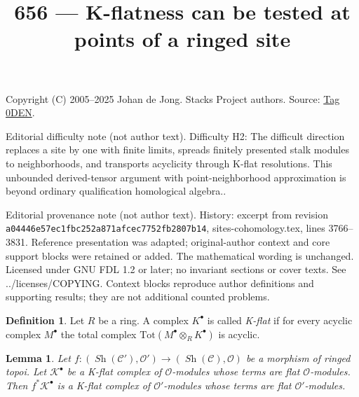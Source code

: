 \documentclass{amsart}
\theoremstyle{plain}
\newtheorem{lemma}[subsection]{Lemma}
\theoremstyle{definition}
\newtheorem{definition}[subsection]{Definition}
\theoremstyle{remark}
\numberwithin{equation}{subsection}
\def\Sh{\mathop{\mathit{Sh}}\nolimits}
\begin{document}
\title[Stacks Project, Tag 0DEN]{656 --- K-flatness can be tested at points of a ringed site}
\maketitle
\noindent Copyright (C) 2005--2025 Johan de Jong. Stacks Project authors. Source: \href{https://stacks.math.columbia.edu/tag/0DEN}{Tag 0DEN}.

\noindent Editorial difficulty note (not author text). Difficulty H2: The difficult direction replaces a site by one with finite limits, spreads finitely presented stalk modules to neighborhoods, and transports acyclicity through K-flat resolutions. This unbounded derived-tensor argument with point-neighborhood approximation is beyond ordinary qualification homological algebra..

\noindent Editorial provenance note (not author text). History: excerpt from revision \texttt{a0444\allowbreak 6e57e\allowbreak c1fbc\allowbreak 252a8\allowbreak 71afc\allowbreak ec775\allowbreak 2fb28\allowbreak 07b14}, sites-cohomology.tex, lines 3766--3831. Reference presentation was adapted; original-author context and core support blocks were retained or added. The mathematical wording is unchanged. Licensed under GNU FDL 1.2 or later; no invariant sections or cover texts. See ../licenses/COPYING. Context blocks reproduce author definitions and supporting results; they are not additional counted problems.

\begin{definition}
\label{more-algebra-definition-K-flat}
Let $R$ be a ring. A complex $K^\bullet$ is called {\it K-flat}
if for every acyclic complex $M^\bullet$ the total complex
$\text{Tot}(M^\bullet \otimes_R K^\bullet)$ is acyclic.
\end{definition}

\begin{lemma}
\label{lemma-pullback-K-flat}
Let $f : (\Sh(\mathcal{C}'), \mathcal{O}') \to (\Sh(\mathcal{C}), \mathcal{O})$
be a morphism of ringed topoi. Let $\mathcal{K}^\bullet$ be a K-flat complex
of $\mathcal{O}$-modules whose terms are flat $\mathcal{O}$-modules. Then
$f^*\mathcal{K}^\bullet$ is a K-flat complex of $\mathcal{O}'$-modules whose
terms are flat $\mathcal{O}'$-modules.
\end{lemma}
\end{document}
